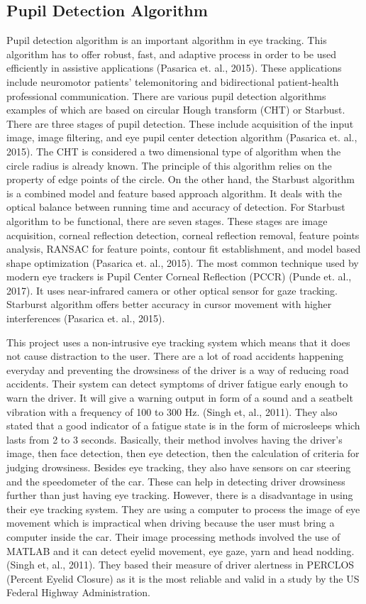 \subsection{Pupil Detection Algorithm}
Pupil detection algorithm is an important algorithm in eye tracking. This algorithm has to offer robust, fast, and adaptive process in order to be used efficiently in assistive applications (Pasarica et. al., 2015). These applications include neuromotor patients’ telemonitoring and bidirectional patient-health professional communication. There are various pupil detection algorithms examples of which are based on circular Hough transform (CHT) or Starbust. There are three stages of pupil detection. These include acquisition of the input image, image filtering, and  eye pupil center detection algorithm (Pasarica et. al., 2015). The CHT is considered a two dimensional type of algorithm when the circle radius is already known. The principle of this algorithm relies on the property of edge points of the circle. On the other hand, the Starbust algorithm is a combined model and feature based approach algorithm. It deals with the optical balance between running time and accuracy of detection. For Starbust algorithm to be functional, there are seven stages. These stages are image acquisition, corneal reflection detection, corneal reflection removal, feature points analysis, RANSAC for feature points, contour fit establishment, and model based shape optimization (Pasarica et. al., 2015). The most common technique used by modern eye trackers is Pupil Center Corneal Reflection (PCCR) (Punde et. al., 2017). It uses near-infrared camera or other optical sensor for gaze tracking. Starburst algorithm offers better accuracy in cursor movement with higher interferences (Pasarica et. al., 2015).
\newline

This project uses a non-intrusive eye tracking system which means that it does not cause distraction to the user. There are a lot of road accidents happening everyday and preventing the drowsiness of the driver is a way of reducing road accidents. Their system can detect symptoms of driver fatigue early enough to warn the driver. It will give a warning output in form of a sound and a seatbelt vibration with a frequency of 100 to 300 Hz. (Singh et, al., 2011). They also stated that a good indicator of a fatigue state is in the form of microsleeps which lasts from 2 to 3 seconds. Basically, their method involves having the driver’s image, then face detection, then eye detection, then the calculation of criteria for judging drowsiness. Besides eye tracking, they also have sensors on car steering and the speedometer of the car. These can help in detecting driver drowsiness further than just having eye tracking. However, there is a disadvantage in using their eye tracking system. They are using a computer to process the image of eye movement which is impractical when driving because the user must bring a computer inside the car. Their image processing methods involved the use of MATLAB and it can detect eyelid movement, eye gaze, yarn and head nodding. (Singh et, al., 2011). They based their measure of driver alertness in PERCLOS (Percent Eyelid Closure) as it is the most reliable and valid in a study by the US Federal Highway Administration.

